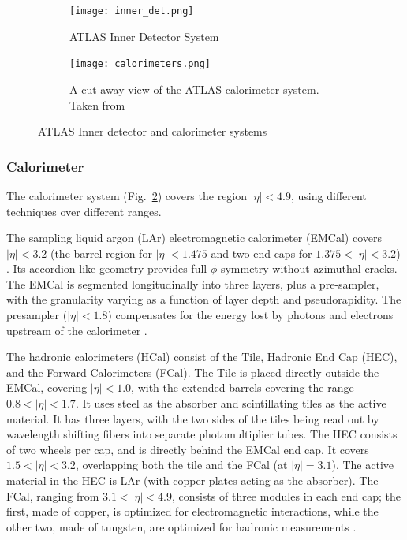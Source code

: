 { \begin{figure}[htbp!]
    \centering
      \begin{subfigure}{0.44\textwidth}
        \texttt{[image: inner\_det.png]}
          \caption{ATLAS Inner Detector System}
          \label{fig:inner_det}
      \end{subfigure}
      \hfill
      \begin{subfigure}{0.49\textwidth}
        \texttt{[image: calorimeters.png]}
          \caption{A cut-away view of the ATLAS calorimeter system. Taken from \cite{Aad:2008zzm}}
          \label{fig:cal}
      \end{subfigure}
\caption{
\label{fig:atlas_systems}%
ATLAS Inner detector and calorimeter systems}
\end{figure}


\subsubsection{Calorimeter}
The calorimeter system (Fig.~\ref{fig:cal}) covers the region $|\eta| < 4.9$, using different techniques over different ranges.

The sampling liquid argon (LAr) electromagnetic calorimeter (EMCal) covers $|\eta| < 3.2$ (the barrel region for $|\eta| < 1.475$ and two end caps for $1.375 < |\eta| < 3.2$) . Its accordion-like geometry provides full $\phi$ symmetry without azimuthal cracks. The EMCal is segmented longitudinally into three layers, plus a pre-sampler, with the granularity varying as a function of layer depth and pseudorapidity. The presampler ($|\eta| <1.8$) compensates for the energy lost by photons and electrons upstream of the calorimeter \cite{Aad:2008zzm}.  

The hadronic calorimeters (HCal) consist of the Tile, Hadronic End Cap (HEC), and the Forward Calorimeters (FCal). The Tile is placed directly outside the EMCal, covering $|\eta| < 1.0$, with the extended barrels covering the range $0.8 <|\eta|< 1.7$. It uses steel as the absorber and scintillating tiles as the active material. It has three layers, with the two sides of the tiles being read out by wavelength shifting fibers into separate photomultiplier tubes. The HEC consists of two wheels per cap, and is directly behind the EMCal end cap. It covers $1.5< |\eta| < 3.2$, overlapping both the tile and the FCal (at $|\eta| =  3.1$). The active material in the HEC is LAr (with copper plates acting as the absorber). The FCal, ranging from $3.1 < |\eta| < 4.9$, consists of three modules in each end cap; the first, made of copper, is optimized for electromagnetic interactions, while the other two, made of tungsten, are optimized for hadronic measurements \cite{Aad:2008zzm}.


}
